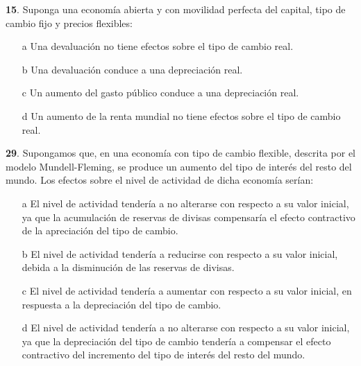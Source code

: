 \documentclass{nuevotema}
\begin{document}

\textbf{15}. Suponga una economía abierta y  con movilidad perfecta del capital, tipo de cambio fijo y precios flexibles:

\begin{enumerate}
	\item[a] Una devaluación no tiene efectos sobre el tipo de cambio real.
	\item[b] Una devaluación conduce a una depreciación real.
	\item[c] Un aumento del gasto público conduce a una depreciación real.
	\item[d] Un aumento de la renta mundial no tiene efectos sobre el tipo de cambio real.
\end{enumerate}

\textbf{29}. Supongamos que, en una economía con tipo de cambio flexible, descrita por el modelo Mundell-Fleming, se produce un aumento del tipo de interés del resto del mundo. Los efectos sobre el nivel de actividad de dicha economía serían:
\begin{enumerate}
	\item[a] El nivel de actividad tendería a no alterarse con respecto a su valor inicial, ya que la acumulación de reservas de divisas compensaría el efecto contractivo de la apreciación del tipo de cambio.
	\item[b] El nivel de actividad tendería a reducirse con respecto a su valor inicial, debida a la disminución de las reservas de divisas.
	\item[c] El nivel de actividad tendería a aumentar con respecto a su valor inicial, en respuesta a la depreciación del tipo de cambio.
	\item[d] El nivel de actividad tendería a no alterarse con respecto a su valor inicial, ya que la depreciación del tipo de cambio tendería a compensar el efecto contractivo del incremento del tipo de interés del resto del mundo.
\end{enumerate}

\end{document}
